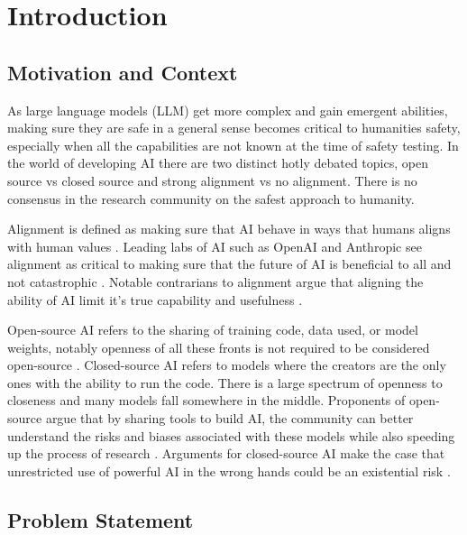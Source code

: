 \section{Introduction}

\subsection{Motivation and Context}

As large language models (LLM) get more complex and gain emergent abilities, making sure they are safe in a general sense becomes critical to humanities safety, especially when all the capabilities are not known at the time of safety testing. In the world of developing AI there are two distinct hotly debated topics, open source vs closed source and strong alignment vs no alignment. There is no consensus in the research community on the safest approach to humanity.

Alignment is defined as making sure that AI behave in ways that humans aligns with human values \citep{ji_ai_2023}. Leading labs of AI such as OpenAI and Anthropic see alignment as critical to making sure that the future of AI is beneficial to all and not catastrophic \citep{openai_alignment, anthropic_core_views}. Notable contrarians to alignment argue that aligning the ability of AI limit it's true capability and usefulness \citep{franzen_2024_interview}.

Open-source AI refers to the sharing of training code, data used, or model weights, notably openness of all these fronts is not required to be considered open-source \citep{eiras_near_2024}. Closed-source AI refers to models where the creators are the only ones with the ability to run the code. There is a large spectrum of openness to closeness and many models fall somewhere in the middle. Proponents of open-source argue that by sharing tools to build AI, the community can better understand the risks and biases associated with these models while also speeding up the process of research \citep{groeneveld_olmo_2024}. Arguments for closed-source AI make the case that unrestricted use of powerful AI in the wrong hands could be an existential risk \citep{deepmind_frontier_2025}.

\subsection{Problem Statement}

